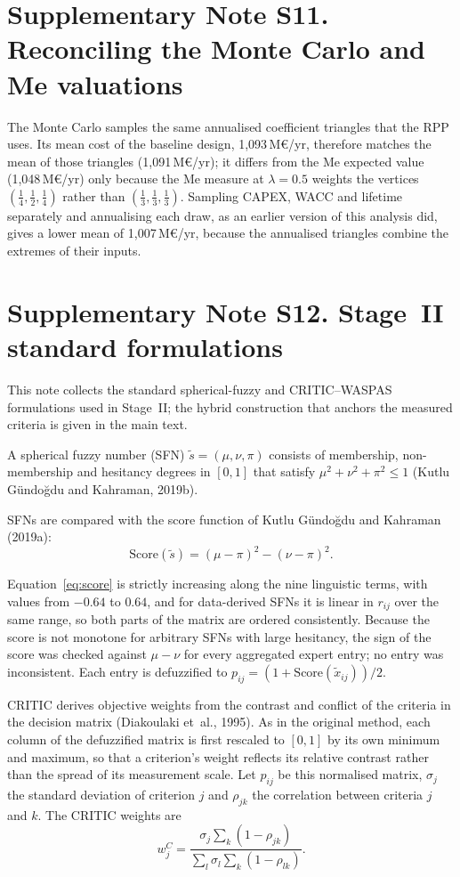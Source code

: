 \documentclass[11pt,a4paper]{article}
\begin{document}
\newpage\section{Supplementary Note S11. Reconciling the Monte Carlo and Me valuations}

The Monte Carlo samples the same annualised coefficient triangles that the RPP uses. Its mean cost of the baseline design, 1,093\,M€/yr, therefore matches the mean of those triangles (1,091\,M€/yr); it differs from the Me expected value (1,048\,M€/yr) only because the Me measure at $\lambda=0.5$ weights the vertices $(\tfrac14,\tfrac12,\tfrac14)$ rather than $(\tfrac13,\tfrac13,\tfrac13)$. Sampling CAPEX, WACC and lifetime separately and annualising each draw, as an earlier version of this analysis did, gives a lower mean of 1,007\,M€/yr, because the annualised triangles combine the extremes of their inputs.


\newpage\section{Supplementary Note S12. Stage~II standard formulations}

This note collects the standard spherical-fuzzy and CRITIC--WASPAS formulations used in Stage~II; the hybrid construction that anchors the measured criteria is given in the main text.

A spherical fuzzy number (SFN) $\tilde{s} = (\mu, \nu, \pi)$ consists of membership, non-membership and hesitancy degrees in $[0,1]$ that satisfy $\mu^2 + \nu^2 + \pi^2 \le 1$ (Kutlu G{\"u}ndo{\u{g}}du and Kahraman, 2019b).

SFNs are compared with the score function of Kutlu G{\"u}ndo{\u{g}}du and Kahraman (2019a):
\begin{equation}
\text{Score}(\tilde{s}) = (\mu - \pi)^2 - (\nu - \pi)^2 .
\label{eq:score}
\end{equation}

Equation~\eqref{eq:score} is strictly increasing along the nine linguistic terms, with values from $-0.64$ to $0.64$, and for data-derived SFNs it is linear in $r_{ij}$ over the same range, so both parts of the matrix are ordered consistently. Because the score is not monotone for arbitrary SFNs with large hesitancy, the sign of the score was checked against $\mu-\nu$ for every aggregated expert entry; no entry was inconsistent. Each entry is defuzzified to $p_{ij} = (1 + \text{Score}(\tilde{x}_{ij}))/2$.

CRITIC derives objective weights from the contrast and conflict of the criteria in the decision matrix (Diakoulaki et~al., 1995). As in the original method, each column of the defuzzified matrix is first rescaled to $[0,1]$ by its own minimum and maximum, so that a criterion's weight reflects its relative contrast rather than the spread of its measurement scale. Let $p_{ij}$ be this normalised matrix, $\sigma_j$ the standard deviation of criterion $j$ and $\rho_{jk}$ the correlation between criteria $j$ and $k$. The CRITIC weights are
\begin{equation}
w_j^{C} = \frac{\sigma_j \sum_{k}(1 - \rho_{jk})}{\sum_{l} \sigma_l \sum_{k}(1 - \rho_{lk})} .
\end{equation}
\end{document}
